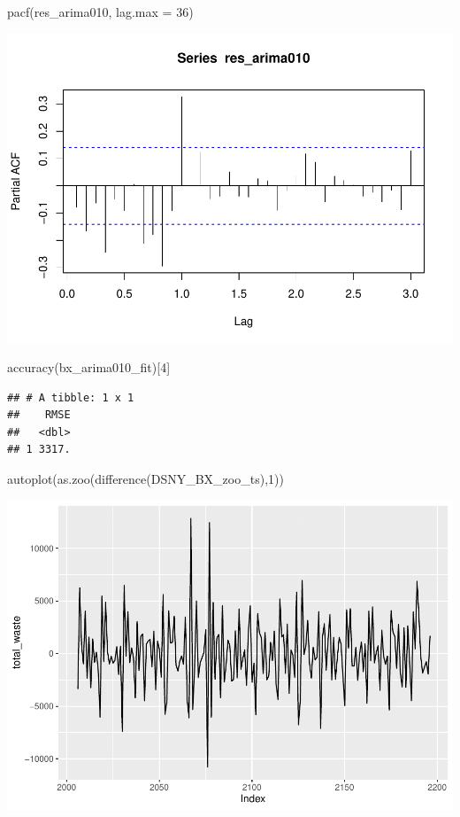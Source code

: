 \documentclass[
]{article}
\newenvironment{Shaded}{\begin{snugshade}}{\end{snugshade}}
\newcommand{\AttributeTok}[1]{\textcolor[rgb]{0.77,0.63,0.00}{#1}}
\newcommand{\DecValTok}[1]{\textcolor[rgb]{0.00,0.00,0.81}{#1}}
\newcommand{\FunctionTok}[1]{\textcolor[rgb]{0.00,0.00,0.00}{#1}}
\newcommand{\NormalTok}[1]{#1}
\begin{document}
\begin{Shaded}
\begin{Highlighting}[]
\FunctionTok{pacf}\NormalTok{(res\_arima010, }\AttributeTok{lag.max =} \DecValTok{36}\NormalTok{)}
\end{Highlighting}
\end{Shaded}

\includegraphics{eighth_meeting_notes_files/figure-latex/arima010-2.pdf}

\begin{Shaded}
\begin{Highlighting}[]
\FunctionTok{accuracy}\NormalTok{(bx\_arima010\_fit)[}\DecValTok{4}\NormalTok{]}
\end{Highlighting}
\end{Shaded}

\begin{verbatim}
## # A tibble: 1 x 1
##    RMSE
##   <dbl>
## 1 3317.
\end{verbatim}

\begin{Shaded}
\begin{Highlighting}[]
\FunctionTok{autoplot}\NormalTok{(}\FunctionTok{as.zoo}\NormalTok{(}\FunctionTok{difference}\NormalTok{(DSNY\_BX\_zoo\_ts),}\DecValTok{1}\NormalTok{))}
\end{Highlighting}
\end{Shaded}

\includegraphics{eighth_meeting_notes_files/figure-latex/arima010-3.pdf}
\end{document}
